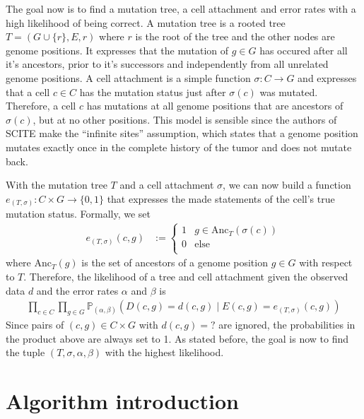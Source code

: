 The goal now is to find a mutation tree, a cell attachment and error rates with a high likelihood of being correct. A mutation tree is a rooted tree $T = (G \cup \{r\}, E, r)$ where $r$ is the root of the tree and the other nodes are genome positions. It expresses that the mutation of $g \in G$ has occured after all it's ancestors, prior to it's successors and independently from all unrelated genome positions. A cell attachment is a simple function $\sigma: C \rightarrow G$ and expresses that a cell $c \in C$ has the mutation status just after $\sigma(c)$ was mutated. Therefore, a cell $c$ has mutations at all genome positions that are ancestors of $\sigma(c)$, but at no other positions. This model is sensible since the authors of \ac{SCITE} make the ``infinite sites'' assumption, which states that a genome position mutates exactly once in the complete history of the tumor and does not mutate back.

With the mutation tree $T$ and a cell attachment $\sigma$, we can now build a function $e_{(T, \sigma)}: C \times G \rightarrow \{0, 1\}$ that expresses the made statements of the cell's true mutation status. Formally, we set
\begin{align*}
    e_{(T, \sigma)}(c, g) &:= \begin{cases}
        1 & g \in \mathrm{Anc}_T(\sigma(c)) \\
        0 & \text{else} \\
    \end{cases}
\end{align*}
where $\mathrm{Anc}_T(g)$ is the set of ancestors of a genome position $g \in G$ with respect to $T$. Therefore, the likelihood of a tree and cell attachment given the observed data $d$ and the error rates $\alpha$ and $\beta$ is
\begin{align*}
    \prod_{c \in C}\prod_{g \in G} \mathbb{P}_{(\alpha, \beta)}(D(c, g) = d(c, g) \mid E(c, g) = e_{(T, \sigma)}(c, g))
\end{align*}
Since pairs of $(c, g) \in C \times G$ with $d(c, g) = ?$ are ignored, the probabilities in the product above are always set to 1. As stated before, the goal is now to find the tuple $(T, \sigma, \alpha, \beta)$ with the highest likelihood.

\section{Algorithm introduction}

